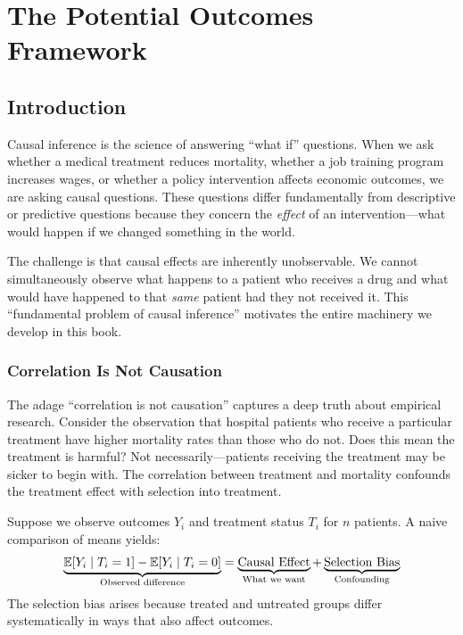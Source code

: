 \chapter{The Potential Outcomes Framework}
\label{ch:potential_outcomes}


\section{Introduction}
\label{sec:po_intro}

Causal inference is the science of answering ``what if'' questions. When we ask whether a medical treatment reduces mortality, whether a job training program increases wages, or whether a policy intervention affects economic outcomes, we are asking causal questions. These questions differ fundamentally from descriptive or predictive questions because they concern the \emph{effect} of an intervention---what would happen if we changed something in the world.

The challenge is that causal effects are inherently unobservable. We cannot simultaneously observe what happens to a patient who receives a drug and what would have happened to that \emph{same} patient had they not received it. This ``fundamental problem of causal inference'' \cite{holland1986statistics} motivates the entire machinery we develop in this book.

\subsection{Correlation Is Not Causation}

The adage ``correlation is not causation'' captures a deep truth about empirical research. Consider the observation that hospital patients who receive a particular treatment have higher mortality rates than those who do not. Does this mean the treatment is harmful? Not necessarily---patients receiving the treatment may be sicker to begin with. The correlation between treatment and mortality confounds the treatment effect with selection into treatment.

\begin{example}
\label{ex:selection_bias}
Suppose we observe outcomes $Y_i$ and treatment status $T_i$ for $n$ patients. A naive comparison of means yields:
\begin{equation}
\underbrace{\mathbb{E}[Y_i \mid T_i = 1] - \mathbb{E}[Y_i \mid T_i = 0]}_{\text{Observed difference}} = \underbrace{\text{Causal Effect}}_{\text{What we want}} + \underbrace{\text{Selection Bias}}_{\text{Confounding}}
\end{equation}
The selection bias arises because treated and untreated groups differ systematically in ways that also affect outcomes.
\end{example}

